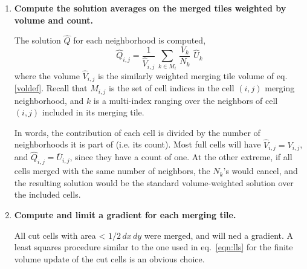 \begin{enumerate}
\item
{\bf Compute the solution averages on the merged tiles weighted by volume
and count.}   

\vspace*{.1in}
The solution $\widehat{Q}$ for each neighborhood is computed,
\begin{equation}
\label{tiledef}
\widehat{Q}_{i,j} =  \frac{1}{{\widehat V}_{i,j}} \, \sum_{k \in M_i} \,  
\frac{V_k}{N_k}  \,\,  \widehat{U}_k
\end{equation}
where the volume ${\widehat V}_{i,j}$ is the 
similarly weighted merging tile volume of eq. \eqref{voldef}.
Recall that $M_{i,j}$ is the set of cell indices in the cell $(i,j)$ merging
neighborhood, and  
$k$ is  a multi-index ranging over the neighbors 
of cell $(i,j)$ included in its merging tile.

In words, the contribution of each cell is divided by the number of neighborhoods 
it is part of (i.e. its count). 
Most full cells will have ${\widehat V}_{i,j} = V_{i,j}$, 
and $\widehat{Q}_{i,j}  = \bar{U}_{i,j}$, since they have a count of one.
At the other extreme, if all cells merged with the same number of neighbors, the $N_k$'s
would cancel, and the resulting solution would be the standard volume-weighted
solution over the included cells. 

\item
{\bf Compute and limit a gradient for each merging tile.}

\vspace*{.1in}
All cut cells with area < $1/2 \, dx \, dy$ were merged, and will ned a
gradient.
A least squares procedure  similar to the one used in eq.~\eqref{eqn:lls} 
for the finite volume update of the cut cells is an 
obvious choice.  


\end{enumerate}
